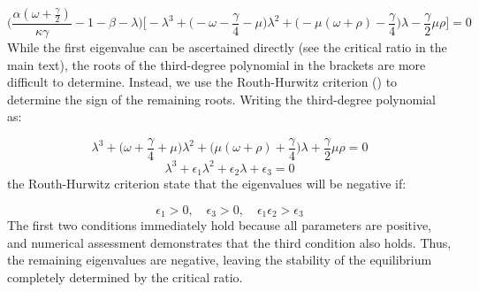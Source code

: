 \documentclass[12pt]{article}
\begin{document}
\begin{equation}
  \Big(\frac{\alpha(\omega + \frac{\gamma}{2})}{\kappa \gamma} - 1 - \beta - \lambda\Big) \Big[ - \lambda^3 + \big(-\omega - \frac{\gamma}{4} - \mu\big) \lambda^2 + \big(- \mu(\omega + \rho) - \frac{\gamma}{4}\big) \lambda - \frac{\gamma}{2} \mu \rho\Big] = 0
\end{equation}
%
While the first eigenvalue can be ascertained directly (see the critical ratio in the main text), the roots of the third-degree polynomial in the brackets are more difficult to determine. Instead, we use the Routh-Hurwitz criterion (\cite{ottoday2011}) to determine the sign of the remaining roots. Writing the third-degree polynomial as:

\begin{equation}
  \lambda^3 + \big(\omega + \frac{\gamma}{4} + \mu\big) \lambda^2 + \big(\mu(\omega + \rho) + \frac{\gamma}{4}\big) \lambda + \frac{\gamma}{2} \mu \rho = 0
\end{equation}
%
\begin{equation}
  \lambda^3 + \epsilon_{1} \lambda^2 + \epsilon_{2} \lambda + \epsilon_{3} = 0
\end{equation}
%
the Routh-Hurwitz criterion state that the eigenvalues will be negative if:

\begin{equation}
  \epsilon_{1} > 0, \quad
  \epsilon_{3} > 0, \quad
  \epsilon_{1} \epsilon_{2} > \epsilon_{3}
\end{equation}
%
The first two conditions immediately hold because all parameters are positive, and numerical assessment demonstrates that the third condition also holds. Thus, the remaining eigenvalues are negative, leaving the stability of the equilibrium completely determined by the critical ratio.
\end{document}
